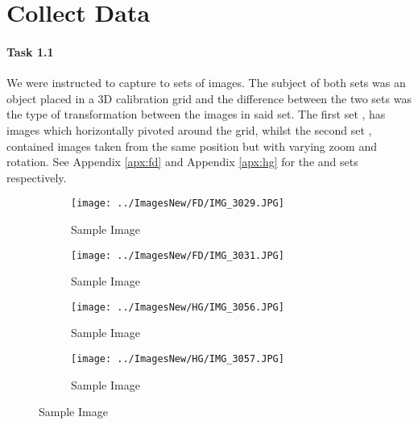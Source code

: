 \section{ Collect Data}

\paragraph{Task 1.1} We were instructed to capture to sets of images. The subject of both sets was an object placed in a 3D calibration grid and the difference between the two sets was the type of transformation between the images in said set. The first set \FD, has images which horizontally pivoted around the grid, whilst the second set \HG, contained images taken from the same position but with varying zoom and rotation. See Appendix \ref{apx:fd} and Appendix \ref{apx:hg} for the \FD and \HG sets respectively.

\begin{figure}[ht]
\begin{center}
   \begin{subfigure}{0.49\linewidth}
   \centering
   \texttt{[image: ../ImagesNew/FD/IMG\_3029.JPG]}
   \caption{\FD Sample Image}
   \label{fd:subfig:1}
   \end{subfigure}
   \begin{subfigure}{0.49\linewidth}
   \centering
   \texttt{[image: ../ImagesNew/FD/IMG\_3031.JPG]}
   \caption{\FD Sample Image}
   \label{fd:subfig:2}
   \end{subfigure}
\newline
   \begin{subfigure}{0.49\linewidth}
   \centering
   \texttt{[image: ../ImagesNew/HG/IMG\_3056.JPG]}
   \caption{\HG Sample Image}
   \label{hg:subfig:1}
   \end{subfigure}
   \begin{subfigure}{0.49\linewidth}
   \centering
   \texttt{[image: ../ImagesNew/HG/IMG\_3057.JPG]}
   \caption{\HG Sample Image}
   \label{hg:subfig:2}
   \end{subfigure}
\end{center}
\label{fig:1}
\end{figure}